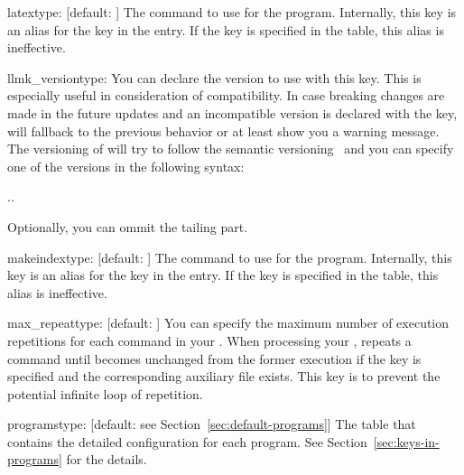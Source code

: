 \documentclass[draft]{llmk-doc}
\begin{document}
\begin{confkey}{latex}{type: }[default: ]
The command to use for the  program. Internally, this key is an
alias for the  key in the  entry. If the
 key is specified in the  table, this alias is
ineffective.
\end{confkey}

\begin{confkey}{llmk\_version}{type: }
You can declare the  version to use with this key. This is
especially useful in consideration of compatibility. In case breaking changes
are made in the future updates and an incompatible version is declared with the
key,  will fallback to the previous behavior or at least show you a
warning message. The versioning of  will try to follow the semantic
versioning~\cite{semvar} and you can specify one of the versions in the
following syntax:
%
\begin{htcode}
..
\end{htcode}
%
Optionally, you can ommit the tailing  part.
\end{confkey}

\begin{confkey}{makeindex}{type: }[default: ]
The command to use for the  program. Internally, this key
is an alias for the  key in the  entry. If
the  key is specified in the  table, this alias is
ineffective.
\end{confkey}

\begin{confkey}{max\_repeat}{type: }[default: ]
You can specify the maximum number of execution repetitions for each command in
your . When processing your ,  repeats
a command until  becomes unchanged from the former execution if
the key is specified and the corresponding auxiliary file exists. This key is to
prevent the potential infinite loop of repetition.
\end{confkey}

\begin{confkey}{programs}{type: }
  [default: see Section~\ref{sec:default-programs}]
The table that contains the detailed configuration for each program. See
Section~\ref{sec:keys-in-programs} for the details.
\end{confkey}
\end{document}

